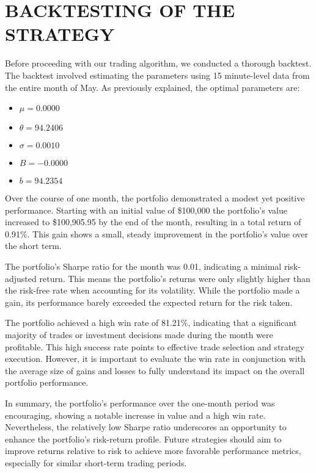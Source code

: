 \documentclass{article}
\begin{document}
\section{BACKTESTING OF THE STRATEGY}

Before proceeding with our trading algorithm, we conducted a thorough backtest. The backtest involved estimating the parameters using 15 minute-level data from the entire month of May. As previously explained, the optimal parameters are:

\begin{itemize}
    \item \( \mu = 0.0000 \)
    \item \( \theta = 94.2406 \)
    \item \( \sigma = 0.0010 \)
    \item \( B = -0.0000 \)
    \item \( b = 94.2354 \)
\end{itemize}

Over the course of one month, the portfolio demonstrated a modest yet positive performance. Starting with an initial value of \$100,000 the portfolio's value increased to \$100,905.95 by the end of the month, resulting in a total return of 0.91\%. This gain shows a small, steady improvement in the portfolio's value over the short term.

The portfolio's Sharpe ratio for the month was 0.01, indicating a minimal risk-adjusted return. This means the portfolio's returns were only slightly higher than the risk-free rate when accounting for its volatility. While the portfolio made a gain, its performance barely exceeded the expected return for the risk taken.

The portfolio achieved a high win rate of 81.21\%, indicating that a significant majority of trades or investment decisions made during the month were profitable. This high success rate points to effective trade selection and strategy execution. However, it is important to evaluate the win rate in conjunction with the average size of gains and losses to fully understand its impact on the overall portfolio performance.

In summary, the portfolio's performance over the one-month period was encouraging, showing a notable increase in value and a high win rate. Nevertheless, the relatively low Sharpe ratio underscores an opportunity to enhance the portfolio's risk-return profile. Future strategies should aim to improve returns relative to risk to achieve more favorable performance metrics, especially for similar short-term trading periods.
\end{document}
